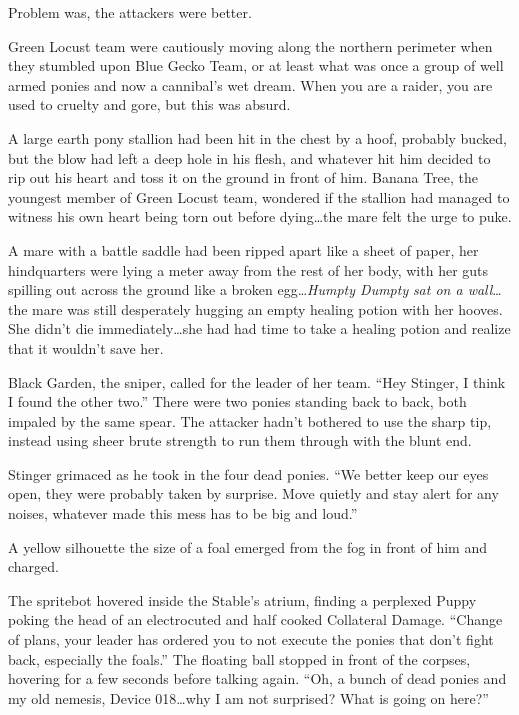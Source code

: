 Problem was, the attackers were better.

Green Locust team were cautiously moving along the northern perimeter when they stumbled upon Blue Gecko Team, or at least what was once a group of well armed ponies and now a cannibal's wet dream. When you are a raider, you are used to cruelty and gore, but this was absurd.

A large earth pony stallion had been hit in the chest by a hoof, probably bucked, but the blow had left a deep hole in his flesh, and whatever hit him decided to rip out his heart and toss it on the ground in front of him. Banana Tree, the youngest member of Green Locust team, wondered if the stallion had managed to witness his own heart being torn out before dying\dots the mare felt the urge to puke.

A mare with a battle saddle had been ripped apart like a sheet of paper, her hindquarters were lying a meter away from the rest of her body, with her guts spilling out across the ground like a broken egg\dots \emph{Humpty Dumpty} \emph{sat on a wall}\dots the mare was still desperately hugging an empty healing potion with her hooves. She didn't die immediately\dots she had had time to take a healing potion and realize that it wouldn't save her.

Black Garden, the sniper, called for the leader of her team. ``Hey Stinger, I think I found the other two.'' There were two ponies standing back to back, both impaled by the same spear. The attacker hadn't bothered to use the sharp tip, instead using sheer brute strength to run them through with the blunt end.

Stinger grimaced as he took in the four dead ponies. ``We better keep our eyes open, they were probably taken by surprise. Move quietly and stay alert for any noises, whatever made this mess has to be big and loud.''

A yellow silhouette the size of a foal emerged from the fog in front of him and charged.

\horizonline


The spritebot hovered inside the Stable's atrium, finding a perplexed Puppy poking the head of an electrocuted and half cooked Collateral Damage. ``Change of plans, your leader has ordered you to not execute the ponies that don't fight back, especially the foals.'' The floating ball stopped in front of the corpses, hovering for a few seconds before talking again. ``Oh, a bunch of dead ponies and my old nemesis, Device 018\dots why I am not surprised? What is going on here?''

